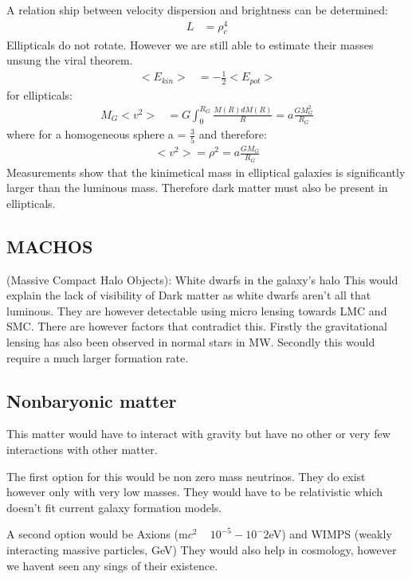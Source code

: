 \documentclass[11pt,a4paper]{article}
\begin{document}
A relation ship between velocity dispersion and brightness can be determined: 
\begin{align*}
    L &= \rho_c^4 
\end{align*}
Ellipticals do not rotate. 
However we are still able to estimate their masses unsung the viral theorem. 
\begin{align*}
    <E_{kin}> &= - \frac 1 2 <E_{pot}> 
\end{align*}
for ellipticals:
\begin{align*}
    M_G<v^2> &= G \int_0^{R_G} \frac {M(R)dM(R)} R = a \frac {GM^2_G}{R_G} 
\end{align*}
where for a homogeneous sphere a = $\frac 3 5$ and therefore:
\begin{align*}
    <v^2> = \rho^2  = a \frac{GM_G}{R_G} 
\end{align*}
Measurements show that the kinimetical mass in elliptical galaxies is significantly larger than the luminous mass.
Therefore dark matter must also be present in ellipticals. 
\subsection{MACHOS}
(Massive Compact Halo Objects): White dwarfs in the galaxy’s halo
This would explain the lack of visibility of Dark matter as white dwarfs aren't all that luminous. 
They are however detectable using micro lensing towards LMC and SMC. 
There are however factors that contradict this. 
Firstly the gravitational lensing has also been observed in normal stars in MW.
Secondly this would require a much larger formation rate. 
\subsection{Nonbaryonic matter}
This matter would have to interact with gravity but have no other or very few interactions with other matter. 

The first option for this would be non zero mass neutrinos. They do exist however only with very low masses.
They would have to be relativistic which doesn't fit current galaxy formation models.

A second option would be Axions (m$c^2$ ~ $10^{-5}-10^-{2}$eV) and WIMPS (weakly interacting massive
particles, GeV)
They would also help in cosmology, however we havent seen any sings of their existence. 
\end{document}
